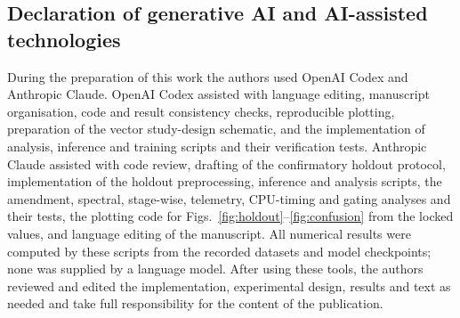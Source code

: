 \documentclass[11pt,a4paper]{article}
\begin{document}
\subsection*{Declaration of generative AI and AI-assisted technologies}

During the preparation of this work the authors used OpenAI Codex and Anthropic Claude. OpenAI Codex
assisted with language editing, manuscript organisation, code and result consistency checks,
reproducible plotting, preparation of the vector study-design schematic, and the implementation of
analysis, inference and training scripts and their verification tests. Anthropic Claude assisted with
code review, drafting of the confirmatory holdout protocol, implementation of the holdout
preprocessing, inference and analysis scripts, the amendment, spectral, stage-wise, telemetry, CPU-timing and gating analyses and their tests,
the plotting code for Figs.~\ref{fig:holdout}--\ref{fig:confusion} from the locked values, and language editing of the manuscript. All numerical results were computed by these scripts from the recorded datasets and model
checkpoints; none was supplied by a language model. After using these tools, the authors reviewed and
edited the implementation, experimental design, results and text as needed and take full
responsibility for the content of the publication.

\begingroup
\small


\endgroup
\end{document}
